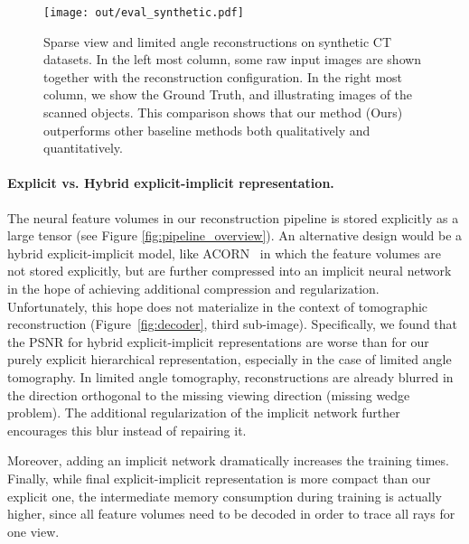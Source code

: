 \documentclass[acmtog,nonacm]{acmart} \acmSubmissionID{0438}
\begin{document}
\begin{figure*}
\texttt{[image: out/eval\_synthetic.pdf]}
	\caption{
		Sparse view and limited angle reconstructions on synthetic CT datasets.
		In the left most column, some raw input images are shown together with the reconstruction configuration.
		In the right most column, we show the Ground Truth, and illustrating images of the scanned objects.
		This comparison shows that our method (Ours) outperforms other baseline methods both qualitatively and quantitatively.
	}
	\label{fig:synth_recons}
\end{figure*}


\paragraph{Explicit vs. Hybrid explicit-implicit representation.}
The neural feature volumes in our reconstruction pipeline is stored
explicitly as a large tensor (see Figure \ref{fig:pipeline_overview}).
An alternative design would be a hybrid explicit-implicit model, like
ACORN~\cite{martel2021acorn} in which the feature volumes are not
stored explicitly, but are further compressed into an implicit neural
network in the hope of achieving additional compression and
regularization. Unfortunately, this hope does not materialize in the
context of tomographic reconstruction (Figure~\ref{fig:decoder}, third
sub-image). Specifically, we found that the PSNR for hybrid
explicit-implicit representations are worse than for our purely
explicit hierarchical representation, especially in the case of
limited angle tomography. In limited angle tomography, reconstructions
are already blurred in the direction orthogonal to the missing viewing
direction (missing wedge problem). The additional regularization of
the implicit network further encourages this blur instead of repairing
it.

Moreover, adding an implicit network dramatically increases the
training times. Finally, while final explicit-implicit representation
is more compact than our explicit one, the intermediate memory
consumption during training is actually higher, since all feature
volumes need to be decoded in order to trace all rays for one view.
\end{document}
